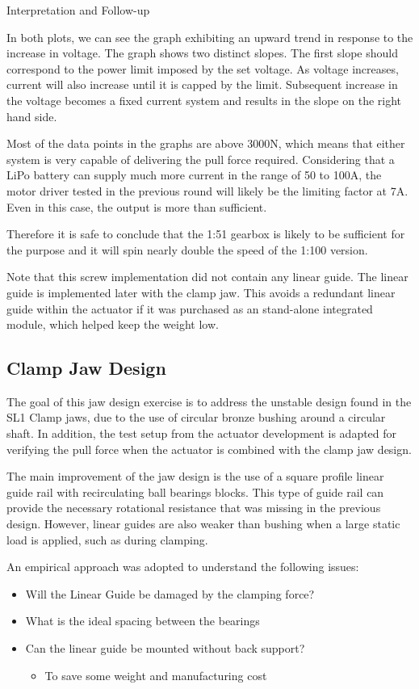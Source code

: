 Interpretation and Follow-up


In both plots, we can see the graph exhibiting an upward trend in response to the increase in voltage. The graph shows two distinct slopes. The first slope should correspond to the power limit imposed by the set voltage. As voltage increases, current will also increase until it is capped by the limit. Subsequent increase in the voltage becomes a fixed current system and results in the slope on the right hand side.

Most of the data points in the graphs are above 3000N, which means that either system is very capable of delivering the pull force required. Considering that a LiPo battery can supply much more current in the range of 50 to 100A, the motor driver tested in the previous round will likely be the limiting factor at 7A. Even in this case, the output is more than sufficient. 

Therefore it is safe to conclude that the 1:51 gearbox is likely to be sufficient for the purpose and it will spin nearly double the speed of the 1:100 version.

Note that this screw implementation did not contain any linear guide. The linear guide is implemented later with the clamp jaw. This avoids a redundant linear guide within the actuator if it was purchased as an stand-alone integrated module, which helped keep the weight low.  

\subsection{Clamp Jaw Design}
\label{subsection:exploration_2_clamp_jaw_design}

The goal of this jaw design exercise is to address the unstable design found in the SL1 Clamp jaws, due to the use of circular bronze bushing around a circular shaft. In addition, the test setup from the actuator development is adapted for verifying the pull force when the actuator is combined with the clamp jaw design.

The main improvement of the jaw design is the use of a square profile linear guide rail with recirculating ball bearings blocks. This type of guide rail can provide the necessary rotational resistance that was missing in the previous design. However, linear guides are also weaker than bushing when a large static load is applied, such as during clamping.

An empirical approach was adopted to understand the following issues:
\begin{itemize}
    \item Will the Linear Guide be damaged by the clamping force?
    \item What is the ideal spacing between the bearings
    \item Can the linear guide be mounted without back support?
    \begin{itemize}
      \item To save some weight and manufacturing cost
    \end{itemize}
\end{itemize}

